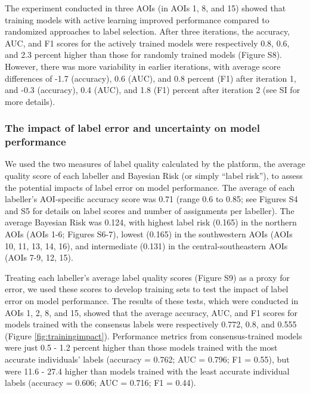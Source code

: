 \documentclass[11pt,a4paper]{article}
\begin{document}
The experiment conducted in three AOIs (in AOIs 1, 8, and 15) showed
that training models with active learning improved performance compared
to randomized approaches to label selection. After three iterations, the
accuracy, AUC, and F1 scores for the actively trained models were
respectively 0.8, 0.6, and 2.3 percent higher than those for randomly
trained models (Figure S8). However, there was more variability in
earlier iterations, with average score differences of -1.7 (accuracy),
0.6 (AUC), and 0.8 percent (F1) after iteration 1, and -0.3 (accuracy),
0.4 (AUC), and 1.8 (F1) percent after iteration 2 (see SI for more
details).

\hypertarget{the-impact-of-label-error-and-uncertainty-on-model-performance}{%
\subsubsection{The impact of label error and uncertainty on model
performance}\label{the-impact-of-label-error-and-uncertainty-on-model-performance}}

We used the two measures of label quality calculated by the platform,
the average quality score of each labeller and Bayesian Risk (or simply
``label risk''), to assess the potential impacts of label error on model
performance. The average of each labeller's AOI-specific accuracy score
was 0.71 (range 0.6 to 0.85; see Figures S4 and S5 for details on label
scores and number of assignments per labeller). The average Bayesian
Risk was 0.124, with highest label risk (0.165) in the northern AOIs
(AOIs 1-6; Figures S6-7), lowest (0.165) in the southwestern AOIs (AOIs
10, 11, 13, 14, 16), and intermediate (0.131) in the
central-southeastern AOIs (AOIs 7-9, 12, 15).

Treating each labeller's average label quality scores (Figure S9) as a
proxy for error, we used these scores to develop training sets to test
the impact of label error on model performance. The results of these
tests, which were conducted in AOIs 1, 2, 8, and 15, showed that the
average accuracy, AUC, and F1 scores for models trained with the
consensus labels were respectively 0.772, 0.8, and 0.555 (Figure
\ref{fig:trainingimpact}). Performance metrics from consensus-trained
models were just 0.5 - 1.2 percent higher than those models trained with
the most accurate individuals' labels (accuracy = 0.762; AUC = 0.796; F1
= 0.55), but were 11.6 - 27.4 higher than models trained with the least
accurate individual labels (accuracy = 0.606; AUC = 0.716; F1 = 0.44).
\end{document}
